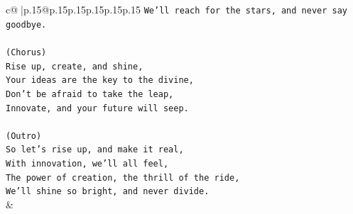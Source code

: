 \documentclass{article}
\begin{document}
{\begin{supertabular}{c@{$\;$}|p{.15\linewidth}@{}p{.15\linewidth}p{.15\linewidth}p{.15\linewidth}p{.15\linewidth}p{.15\linewidth}}
{{{\texttt{We'll reach for the stars, and never say goodbye.} \\
\\ 
\texttt{(Chorus)} \\
\texttt{Rise up, create, and shine,} \\
\texttt{Your ideas are the key to the divine,} \\
\texttt{Don't be afraid to take the leap,} \\
\texttt{Innovate, and your future will seep.} \\
\\ 
\texttt{(Outro)} \\
\texttt{So let's rise up, and make it real,} \\
\texttt{With innovation, we'll all feel,} \\
\texttt{The power of creation, the thrill of the ride,} \\
\texttt{We'll shine so bright, and never divide.} \\
            }
        }
    }
    & \\ \\


\end{supertabular}}
\end{document}
